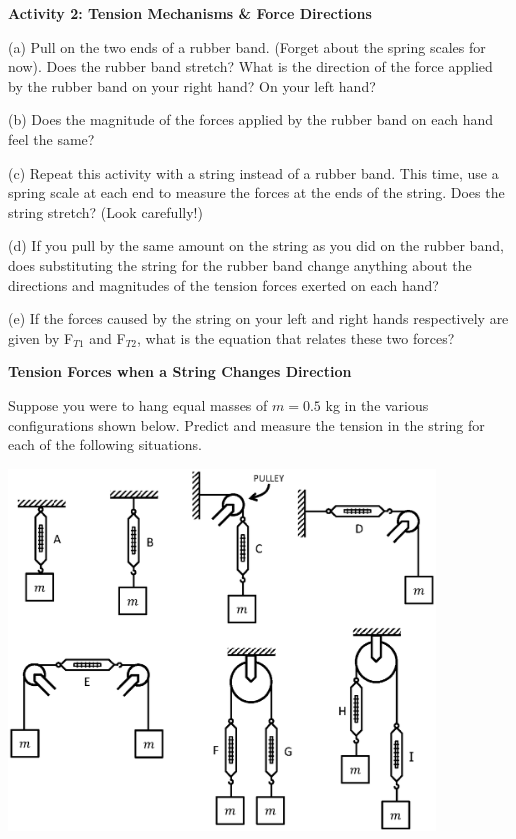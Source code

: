 \textbf{Activity 2: Tension Mechanisms \& Force Directions }

(a) Pull on the two ends of a rubber band. (Forget about the spring scales for
now). Does the rubber band stretch? What is the direction of the force applied
by the rubber band on your right hand? On your left hand?
\answerspace{20mm}

(b) Does the magnitude of the forces applied by the rubber band on each hand
feel the same?
\answerspace{20mm}

(c) Repeat this activity with a string instead of a rubber band. This time,
use a spring scale at each end to measure the forces at the ends of the string.
Does the string stretch? (Look carefully!)
\answerspace{20mm}

(d) If you pull by the same amount on the string as you did on the rubber band,
does substituting the string for the rubber band change anything about the directions
and magnitudes of the tension forces exerted on each hand? 
\answerspace{10mm}

(e) If the forces caused by the string on your left and right hands respectively
are given by F\( _{T1} \) and F\( _{T2} \), what is the equation that relates
these two forces?
\answerspace{20mm}

\pagebreak[3]
\textbf{Tension Forces when a String Changes Direction }

Suppose you were to hang equal masses of $m = 0.5$
kg in the various configurations
shown below. Predict and measure the tension in the string for each of the following
situations.

{\par\centering \includegraphics[width=0.85\textwidth]{newton/newton_fig5_new.eps} \par}

